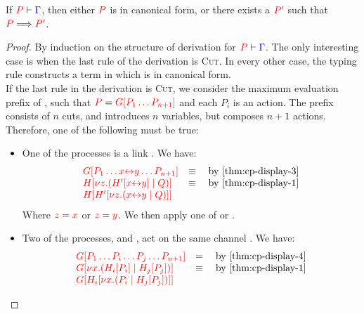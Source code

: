 \begin{theorem}[Progress]\label{thm:cp-progress-3}
  If $\seq[{ P }]{ \Gamma }$, then either $\tm{P}$ is in canonical form, or
  there exists a $\tm{P'}$ such that $\reducesto{P}{P'}$. 
\end{theorem}
\begin{proof}
  By induction on the structure of derivation for $\seq[{ P }]{ \Gamma }$.
  The only interesting case is when the last rule of the derivation is
  \textsc{Cut}. In every other case, the typing rule constructs a term in which
  is in canonical form. 
  \\
  If the last rule in the derivation is \textsc{Cut}, we consider the maximum
  evaluation prefix  of , such that $\tm{P} = \tm{\cpPlug{G}{P_1
      \dots P_{n+1}}}$ and each $P_i$ is an action.
  The prefix  consists of $n$ cuts, and introduces $n$ variables, but
  composes $n+1$ actions. Therefore, one of the following must be true:
  \begin{itemize}
  \item
    One of the processes is a link .
    We have:
    \begin{gather*}
      \begin{array}{ll}
        \tm{\cpPlug{G}{P_1 \dots \cpLink{x}{y} \dots P_{n+1}}}
        & \equiv \quad \text{by \cref{thm:cp-display-3}}
        \\
        \tm{\cpPlug{H}{\cpCut{z}{\cpPlug{H'}{\cpLink{x}{y}}}{Q}}}
        & \equiv \quad \text{by \cref{thm:cp-display-1}}
        \\
        \tm{\cpPlug{H}{\cpPlug{H'}{\cpCut{z}{\cpLink{x}{y}}{Q}}}}
      \end{array}
    \end{gather*}
    Where $\tm{z} = \tm{x}$ or $\tm{z} = \tm{y}$.
    We then apply one of  or .
  \item
    Two of the processes,  and , act on the same channel .
    We have:
    \begin{gather*}
      \begin{array}{ll}
        \tm{\cpPlug{G}{P_1 \dots P_i \dots P_j \dots P_{n+1}}}
        & = \quad \text{by \cref{thm:cp-display-4}}
        \\
        \tm{\cpPlug{G}{\cpCut{x}{\cpPlug{H_i}{P_i}}{\cpPlug{H_j}{P_j}}}}
        & \equiv \quad \text{by \cref{thm:cp-display-1}} 
        \\
        \tm{\cpPlug{G}{\cpPlug{H_i}{\cpCut{x}{P_i}{\cpPlug{H_j}{P_j}}}}}

\end{array}
\end{gather*}
\end{itemize}
\end{proof}
